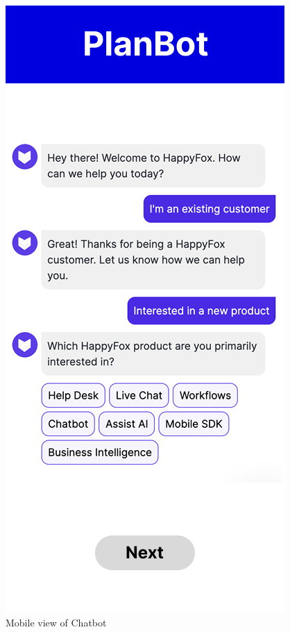 \documentclass[conference]{IEEEtran}
\begin{document}
\begin{figure}[H]
    \centering
    \includegraphics[width=1\linewidth]{Mobile/Group 14MOBILE.png}
    \caption{Mobile view of Chatbot}
    \label{fig:user flow}
\end{figure}
\end{document}
